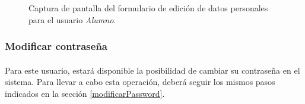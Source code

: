   \begin{figure}[!ht]
    \begin{center}
      \caption{Captura de pantalla del formulario de edición de datos personales para el usuario \textit{Alumno}.}
      \label{capturaModificarDatosAlumno}
    \end{center}
  \end{figure}


  \subsubsection{Modificar contraseña}

  \paragraph{}Para este usuario, estará disponible la posibilidad de cambiar su
  contraseña en el sistema. Para llevar a cabo esta operación, deberá seguir los
  mismos pasos indicados en la sección \ref{modificarPassword}.

